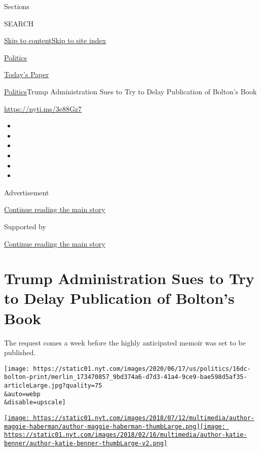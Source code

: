 Sections

SEARCH

\protect\hyperlink{site-content}{Skip to
content}\protect\hyperlink{site-index}{Skip to site index}

\href{https://www.nytimes.com/section/politics}{Politics}

\href{https://myaccount.nytimes.com/auth/login?response_type=cookie\&client_id=vi}{}

\href{https://www.nytimes.com/section/todayspaper}{Today's Paper}

\href{/section/politics}{Politics}\textbar{}Trump Administration Sues to
Try to Delay Publication of Bolton's Book

\url{https://nyti.ms/3e88Gz7}

\begin{itemize}
\item
\item
\item
\item
\item
\item
\end{itemize}

Advertisement

\protect\hyperlink{after-top}{Continue reading the main story}

Supported by

\protect\hyperlink{after-sponsor}{Continue reading the main story}

\hypertarget{trump-administration-sues-to-try-to-delay-publication-of-boltons-book}{%
\section{Trump Administration Sues to Try to Delay Publication of
Bolton's
Book}\label{trump-administration-sues-to-try-to-delay-publication-of-boltons-book}}

The request comes a week before the highly anticipated memoir was set to
be published.

\texttt{[image: https://static01.nyt.com/images/2020/06/17/us/politics/16dc-bolton-print/merlin\_173470857\_9bd374a6-d7d3-41a4-9ce9-bae598d5af35-articleLarge.jpg?quality=75\\\&auto=webp\\\&disable=upscale]}

\href{https://www.nytimes.com/by/maggie-haberman}{\texttt{[image: https://static01.nyt.com/images/2018/07/12/multimedia/author-maggie-haberman/author-maggie-haberman-thumbLarge.png]}}\href{https://www.nytimes.com/by/katie-benner}{\texttt{[image: https://static01.nyt.com/images/2018/02/16/multimedia/author-katie-benner/author-katie-benner-thumbLarge-v2.png]}}

